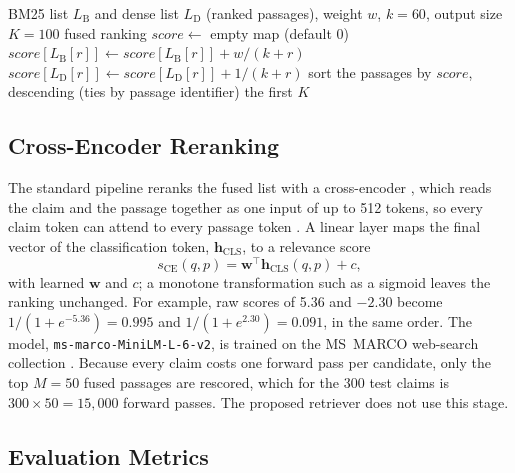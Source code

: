 \begin{algorithm}[t]
\caption{Weighted reciprocal rank fusion}
\label{alg:rrf}
\begin{algorithmic}[1]
\Require BM25 list $L_{\mathrm{B}}$ and dense list $L_{\mathrm{D}}$ (ranked passages), weight $w$, $k = 60$, output size $K = 100$
\Ensure fused ranking
\State $\mathit{score} \gets$ empty map (default 0)
 $\mathit{score}[L_{\mathrm{B}}[r]] \gets \mathit{score}[L_{\mathrm{B}}[r]] + w / (k + r)$ \EndFor
{} $\mathit{score}[L_{\mathrm{D}}[r]] \gets \mathit{score}[L_{\mathrm{D}}[r]] + 1 / (k + r)$ \EndFor
\State sort the passages by $\mathit{score}$, descending (ties by passage identifier)
\State \Return the first $K$
\end{algorithmic}
\end{algorithm}

\subsection{Cross-Encoder Reranking}
\label{sec:rerank}

The standard pipeline reranks the fused list with a cross-encoder \parencite{nogueira2019passage},
which reads the claim and the passage together as one input of up to 512 tokens, so every claim
token can attend to every passage token \parencite{devlin2019bert}. A linear layer maps the final
vector of the classification token, $\mathbf{h}_{\mathrm{CLS}}$, to a relevance score
\begin{equation}
s_{\mathrm{CE}}(q, p) = \mathbf{w}^{\top} \mathbf{h}_{\mathrm{CLS}}(q, p) + c,
\label{eq:ce}
\end{equation}
with learned $\mathbf{w}$ and $c$; a monotone transformation such as a sigmoid leaves the
ranking unchanged. For example, raw scores of 5.36 and $-2.30$ become
$1 / (1 + e^{-5.36}) = 0.995$ and $1 / (1 + e^{2.30}) = 0.091$, in the same order. The model,
\texttt{ms-marco-MiniLM-L-6-v2}, is trained on the MS~MARCO web-search collection
\parencite{bajaj2016msmarco}. Because every claim costs one forward pass per candidate, only the
top $M = 50$ fused passages are rescored, which for the 300 test claims is
$300 \times 50 = 15{,}000$ forward passes. The proposed retriever does not use this stage.

\subsection{Evaluation Metrics}
\label{sec:metrics}


